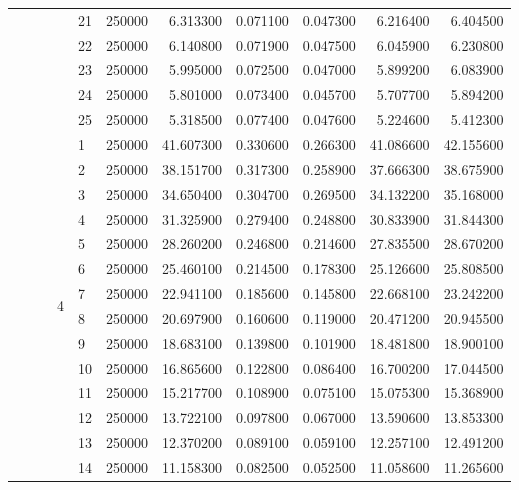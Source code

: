 \begin{tabular}{llllllrrrrr}
 &  &  &  & 21 & 250000 & 6.313300 & 0.071100 & 0.047300 & 6.216400 & 6.404500 \\
\cline{5-11}
 &  &  &  & 22 & 250000 & 6.140800 & 0.071900 & 0.047500 & 6.045900 & 6.230800 \\
\cline{5-11}
 &  &  &  & 23 & 250000 & 5.995000 & 0.072500 & 0.047000 & 5.899200 & 6.083900 \\
\cline{5-11}
 &  &  &  & 24 & 250000 & 5.801000 & 0.073400 & 0.045700 & 5.707700 & 5.894200 \\
\cline{5-11}
 &  &  &  & 25 & 250000 & 5.318500 & 0.077400 & 0.047600 & 5.224600 & 5.412300 \\
\cline{4-11} \cline{5-11}
 &  &  & \multirow[t]{25}{*}{4} & 1 & 250000 & 41.607300 & 0.330600 & 0.266300 & 41.086600 & 42.155600 \\
\cline{5-11}
 &  &  &  & 2 & 250000 & 38.151700 & 0.317300 & 0.258900 & 37.666300 & 38.675900 \\
\cline{5-11}
 &  &  &  & 3 & 250000 & 34.650400 & 0.304700 & 0.269500 & 34.132200 & 35.168000 \\
\cline{5-11}
 &  &  &  & 4 & 250000 & 31.325900 & 0.279400 & 0.248800 & 30.833900 & 31.844300 \\
\cline{5-11}
 &  &  &  & 5 & 250000 & 28.260200 & 0.246800 & 0.214600 & 27.835500 & 28.670200 \\
\cline{5-11}
 &  &  &  & 6 & 250000 & 25.460100 & 0.214500 & 0.178300 & 25.126600 & 25.808500 \\
\cline{5-11}
 &  &  &  & 7 & 250000 & 22.941100 & 0.185600 & 0.145800 & 22.668100 & 23.242200 \\
\cline{5-11}
 &  &  &  & 8 & 250000 & 20.697900 & 0.160600 & 0.119000 & 20.471200 & 20.945500 \\
\cline{5-11}
 &  &  &  & 9 & 250000 & 18.683100 & 0.139800 & 0.101900 & 18.481800 & 18.900100 \\
\cline{5-11}
 &  &  &  & 10 & 250000 & 16.865600 & 0.122800 & 0.086400 & 16.700200 & 17.044500 \\
\cline{5-11}
 &  &  &  & 11 & 250000 & 15.217700 & 0.108900 & 0.075100 & 15.075300 & 15.368900 \\
\cline{5-11}
 &  &  &  & 12 & 250000 & 13.722100 & 0.097800 & 0.067000 & 13.590600 & 13.853300 \\
\cline{5-11}
 &  &  &  & 13 & 250000 & 12.370200 & 0.089100 & 0.059100 & 12.257100 & 12.491200 \\
\cline{5-11}
 &  &  &  & 14 & 250000 & 11.158300 & 0.082500 & 0.052500 & 11.058600 & 11.265600 \\

\end{tabular}
